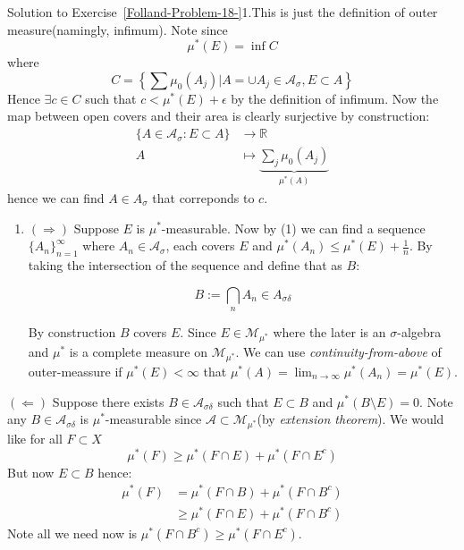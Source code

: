 \begin{mystsolution}{Solution to Exercise~\ref{Folland-Problem-18-}}1.This is just the definition of outer measure(namingly, infimum). Note since
\begin{equation}
\mu^*(E)= \inf C
\end{equation}
where
\begin{equation}
C= \left\{\sum \mu_0(A_j) | A=\cup A_j\in \mathcal A_{\sigma}, E\subset A \right\}
\end{equation}
Hence $\exists c\in C$ such that $c < \mu^*(E)+\epsilon$ by the definition of infimum. Now the map between open covers and their area is clearly surjective by construction:
\begin{equation}
\begin{aligned}
\{A\in \mathcal A_{\sigma} : E\subset A\} &\to \mathbb{R} \\
A &\mapsto \underbrace{\sum_j \mu_0(A_j)}_{\mu^*(A)}
\end{aligned}
\end{equation}
hence we can find $A\in A_{\sigma}$ that correponds to $c$.

\begin{enumerate}[resume]
\item $(\Longrightarrow)$ Suppose $E$ is $\mu^*$-measurable. Now by (1) we can find a sequence $\{A_n\}_{n=1}^{\infty}$ where $A_n\in \mathcal A_{\sigma}$, each covers $E$ and $\mu^*(A_n)\leq \mu^*(E)+\frac1n$.  By taking the intersection of the sequence and define that as $B$:

\begin{equation}
B:=\bigcap_{n}A_{n} \in A_{\sigma \delta}
\end{equation}


By construction $B$ covers $E$. Since $E\in \mathcal M_{\mu^*}$ where the later is an $\sigma$-algebra and $\mu^*$ is a complete measure on $\mathcal{M}_{\mu^*}$. We can use \textit{continuity-from-above} of outer-meassure if $\mu^*(E)<\infty$ that $\mu^*(A)=\lim_{n \to \infty}\mu^*(A_n)=\mu^*(E)$.
\end{enumerate}

$(\Longleftarrow)$ Suppose there exists $B\in \mathcal A_{\sigma \delta}$ such that $E\subset B$ and $\mu^*(B\setminus E)=0$. Note any $B\in \mathcal A_{\sigma \delta}$ is $\mu^*$-measurable since $\mathcal A \subset \mathcal M_{\mu^*}$(by \textit{extension theorem}).
We would like for all $F\subset X$
\begin{equation}
\mu^*(F) \geq  \mu^*(F\cap E) +\mu^*(F \cap E^c)
\end{equation}
But now $E\subset B$ hence:
\begin{equation}
\begin{aligned}
\mu^*(F) &= \mu^*(F\cap B) + \mu^*(F\cap B^c) \\ 
&\geq  \mu^*(F\cap E) + \mu^*(F\cap B^c)
\end{aligned}
\end{equation}
Note all we need now is $\mu^*(F \cap B^c) \geq  \mu^*(F\cap E^c)$.


\end{mystsolution}
